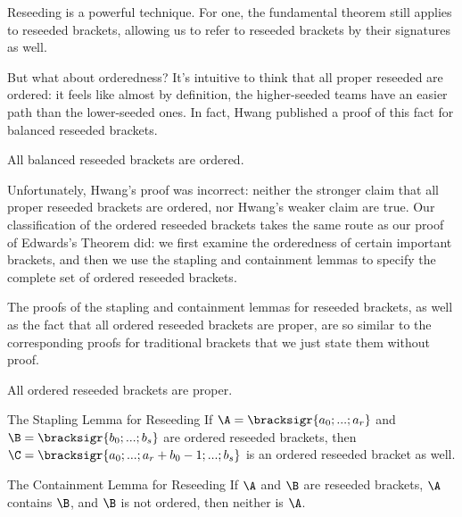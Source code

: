 {    Reseeding is a powerful technique. For one, the fundamental theorem still applies to reseeded brackets, allowing us to refer to reseeded brackets by their signatures as well.


    But what about orderedness? It's intuitive to think that all proper reseeded are ordered: it feels like almost by definition, the higher-seeded teams have an easier path than the lower-seeded ones. In fact, Hwang \cite{reseeding} published a proof of this fact for balanced reseeded brackets.

    \begin{conj}{}{}
        All balanced reseeded brackets are ordered.
    \end{conj}

    Unfortunately, Hwang's proof was incorrect: neither the stronger claim that all proper reseeded brackets are ordered, nor Hwang's weaker claim are true. Our classification of the ordered reseeded brackets takes the same route as our proof of Edwards's Theorem did: we first examine the orderedness of certain important brackets, and then we use the stapling and containment lemmas to specify the complete set of ordered reseeded brackets.

    The proofs of the stapling and containment lemmas for reseeded brackets, as well as the fact that all ordered reseeded brackets are proper, are so similar to the corresponding proofs for traditional brackets that we just state them without proof.

    \begin{theorem}{}{}
        All ordered reseeded brackets are proper.
    \end{theorem}
    \begin{lemma}{The Stapling Lemma for Reseeding}{}
        If $\A = \bracksigr{a_0; ...; a_r}$ and $\B = \bracksigr{b_0; ...; b_s}$ are ordered reseeded brackets, then $\C = \bracksigr{a_0; ...; a_r + b_0 - 1; ...; b_s}$ is an ordered reseeded bracket as well.
    \end{lemma}
    \begin{lemma}{The Containment Lemma for Reseeding}{}
        If $\A$ and $\B$ are reseeded brackets, $\A$ contains $\B$, and $\B$ is not ordered, then neither is $\A$.
    \end{lemma}

}
